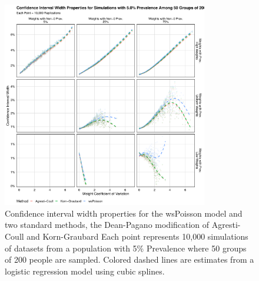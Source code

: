 \documentclass[AMA,STIX1COL]{WileyNJD-v2}
\begin{document}
\begin{figure}
\centering
\includegraphics[width=0.8\textwidth]{figures/perfect_confidence_interval_width_50_groups_0_05_prev}
\caption{Confidence interval width properties for the wsPoisson model and two standard methods, the Dean-Pagano modification of Agresti-Coull and Korn-Graubard
Each point represents 10,000 simulations of datasets from a population with 5\% Prevalence where 50 groups of 200 people are sampled.
Colored dashed lines are estimates from a logistic regression model using cubic splines.}
\label{fig:perfect_confidence_interval_width_50_groups_0_05_prev}
\end{figure}
\end{document}
